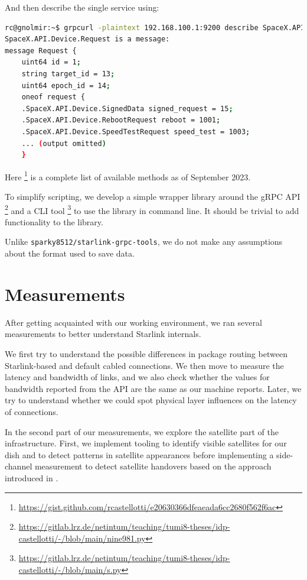 \documentclass[IN,11pt,twoside,openright,idp,english]{tumthesis}
\begin{document}
And then describe the single service using:
    
\begin{lstlisting}[language=bash]
rc@gnolmir:~$ grpcurl -plaintext 192.168.100.1:9200 describe SpaceX.API.Device.Request
SpaceX.API.Device.Request is a message:
message Request {
    uint64 id = 1;
    string target_id = 13;
    uint64 epoch_id = 14;
    oneof request {
    .SpaceX.API.Device.SignedData signed_request = 15;
    .SpaceX.API.Device.RebootRequest reboot = 1001;
    .SpaceX.API.Device.SpeedTestRequest speed_test = 1003;
    ... (output omitted)
    }
\end{lstlisting}
    
Here \footnote{\url{https://gist.github.com/rcastellotti/e20630366dfeaeada6cc2680f562f6ac}} is a complete list of available methods as of September 2023.

To simplify scripting, we develop a simple wrapper library around the gRPC API  \footnote{\url{https://gitlab.lrz.de/netintum/teaching/tumi8-theses/idp-castellotti/-/blob/main/nine981.py}} and a CLI tool \footnote{\url{https://gitlab.lrz.de/netintum/teaching/tumi8-theses/idp-castellotti/-/blob/main/s.py}} to use the library in command line. It should be trivial to add functionality to the library.

Unlike \texttt{sparky8512/starlink-grpc-tools}, we do not make any assumptions about the format used to save data.
    
\chapter{Measurements}

After getting acquainted with our working environment, we ran several measurements to better understand Starlink internals. 
    
We first try to understand the possible differences in package routing between Starlink-based and default cabled connections. We then move to measure the latency and bandwidth of links, and we also check whether the values for bandwidth reported from the API are the same as our machine reports. Later, we try to understand whether we could spot physical layer influences on the latency of connections.  
    
In the second part of our measurements, we explore the satellite part of the infrastructure. First, we implement tooling to identify visible satellites for our dish and to detect patterns in satellite appearances before implementing a side-channel measurement to detect satellite handovers based on the approach introduced in \cite{izhikevich2023democratizing}.
    
\end{document}
